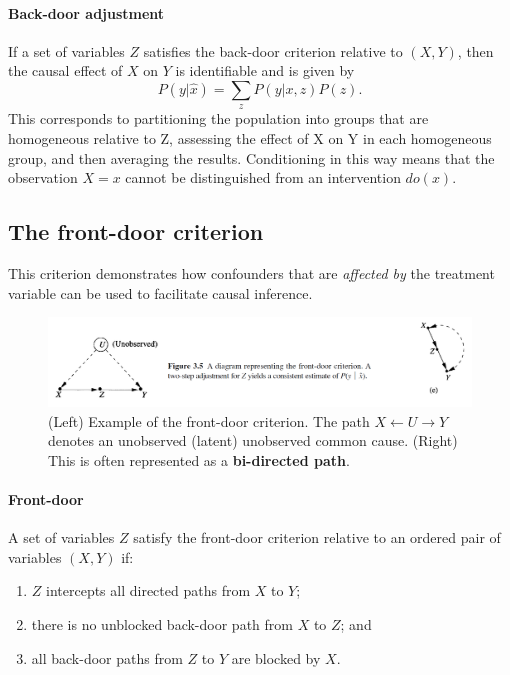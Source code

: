 \documentclass[11pt]{article}
\numberwithin{equation}{section}
\begin{document}
\paragraph{Back-door adjustment}
If a set of variables $Z$ satisfies the back-door criterion relative to $(X,Y)$, then the causal effect of $X$ on $Y$ is identifiable and is given by
\begin{equation}
P(y|\hat{x}) = \sum_z P(y|x,z)P(z).
\end{equation}
This corresponds to partitioning the population into groups that are homogeneous relative to Z, assessing the effect of X on Y in each homogeneous group, and then averaging the results. Conditioning in this way means that the observation $X=x$ cannot be distinguished from an intervention $do(x)$.

\subsection{The front-door criterion}
This criterion demonstrates how confounders that are \textit{affected by} the treatment variable can be used to facilitate causal inference.

\begin{figure}
\begin{center}
\includegraphics[width=0.8\columnwidth]{figures/front-door.png}  
\end{center}
\caption{(Left) Example of the front-door criterion. The path $X \leftarrow U \rightarrow Y$ denotes an unobserved (latent) unobserved common cause. (Right) This is often represented as a \textbf{bi-directed path}. 
}
\label{Fig:front_door}
\end{figure}

\paragraph{Front-door} 
A set of variables $Z$ satisfy the front-door criterion relative to an ordered pair of variables $(X, Y)$ if:
\begin{enumerate}[noitemsep]
\item $Z$ intercepts all directed paths from $X$ to $Y$; 
\item there is no unblocked back-door path from $X$ to $Z$; and
\item all back-door paths from $Z$ to $Y$ are blocked by $X$.
\end{enumerate}
\end{document}
